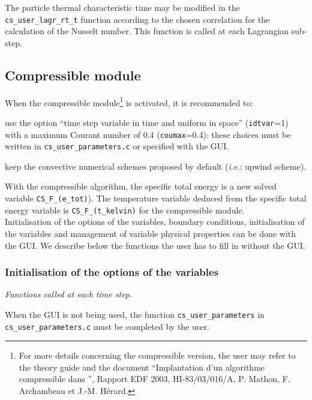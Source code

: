 \noindent
The particle thermal characteristic time may be modified in the \texttt{cs\_user\_lagr\_rt\_t} function according to the chosen correlation for the calculation of the
Nusselt number. This function is called at each Lagrangian sub-step.


\subsection{Compressible module}

When the compressible module\footnote{For more details concerning the
compressible version, the user may refer to the theory guide \cite{theory} and the document ``Implantation
d'un algorithme compressible dans \CS'', Rapport EDF 2003,
HI-83/03/016/A, P. Mathon, F. Archambeau et J.-M. H\'erard.} is
activated, it is recommended to:
\begin{list}{-}{}
 \item use the option ``time step variable in time and uniform in
       space'' (\texttt{idtvar}=1) with a maximum Courant number of 0.4
       (\texttt{coumax}=0.4): these choices must be written in \texttt{cs\_user\_parameters.c}
       or specified with the GUI.
 \item keep the convective numerical schemes proposed by default (\textit{i.e.}: upwind scheme).
\end{list}
With the compressible algorithm, the specific total energy is a new solved variable
\texttt{CS\_F\_(e\_tot)}). The temperature variable deduced from the specific
total energy variable is \texttt{CS\_F\_(t\_kelvin)} for the compressible module.\\
Initialisation of the options of the variables, boundary conditions, initialisation of the variables and
management of variable physical properties can be done with the GUI. We describe below the functions
the user has to fill in without the GUI.

\subsubsection{ Initialisation of the options of the variables}
\label{prg_uscfx12}%
\noindent
\textit{Functions called at each time step.}

When the GUI is not being used, the function \texttt{cs\_user\_parameters} in \texttt{cs\_user\_parameters.c}
must be completed by the user.

